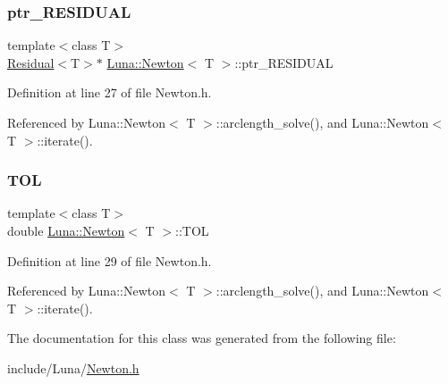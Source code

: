 \subsubsection{\texorpdfstring{ptr\+\_\+\+R\+E\+S\+I\+D\+U\+AL}{ptr\_RESIDUAL}}
{\footnotesize\ttfamily template$<$class T$>$ \\
\hyperlink{classLuna_1_1Residual}{Residual}$<$T$>$$\ast$ \hyperlink{classLuna_1_1Newton}{Luna\+::\+Newton}$<$ T $>$\+::ptr\+\_\+\+R\+E\+S\+I\+D\+U\+AL\hspace{0.3cm}{\ttfamily [protected]}}



Definition at line 27 of file Newton.\+h.



Referenced by Luna\+::\+Newton$<$ T $>$\+::arclength\+\_\+solve(), and Luna\+::\+Newton$<$ T $>$\+::iterate().

\mbox{\label{classLuna_1_1Newton_a13234002150648ac70297ef68a41c9c7}} 
\subsubsection{\texorpdfstring{T\+OL}{TOL}}
{\footnotesize\ttfamily template$<$class T$>$ \\
double \hyperlink{classLuna_1_1Newton}{Luna\+::\+Newton}$<$ T $>$\+::T\+OL\hspace{0.3cm}{\ttfamily [protected]}}



Definition at line 29 of file Newton.\+h.



Referenced by Luna\+::\+Newton$<$ T $>$\+::arclength\+\_\+solve(), and Luna\+::\+Newton$<$ T $>$\+::iterate().



The documentation for this class was generated from the following file\+:\begin{DoxyCompactItemize}
\item 
include/\+Luna/\hyperlink{Newton_8h}{Newton.\+h}\end{DoxyCompactItemize}
